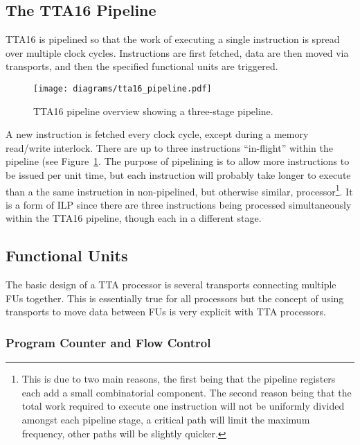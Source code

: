 \subsection{The TTA16 Pipeline}
TTA16 is pipelined so that the work of executing a single instruction is spread
over multiple clock cycles. Instructions are first fetched, data are then moved
via transports, and then the specified functional units are triggered.

\begin{figure}[h!]
\begin{center}
\texttt{[image: diagrams/tta16\_pipeline.pdf]}
\caption[TTA16 pipeline overview]{TTA16 pipeline overview showing a three-stage
pipeline.}
\end{center}
\label{TTA16_Pipeline}
\end{figure}

A new instruction is fetched every clock cycle, except during a memory read/write
interlock. There are up to three instructions ``in-flight'' within the pipeline
(see Figure~\ref{TTA16_Pipeline}. The purpose of pipelining is to allow more
instructions to be issued per unit time, but each instruction will probably take
longer to execute than a the same instruction in non-pipelined, but otherwise
similar, processor\footnote{This is due to two main reasons, the first being that
the pipeline registers each add a small combinatorial component. The second
reason being that the total work required to execute one instruction will not be
uniformly divided amongst each pipeline stage, a critical path will limit the
maximum frequency, other paths will be slightly quicker.}. It is a form of ILP
since there are three instructions being processed simultaneously within the
TTA16 pipeline, though each in a different stage.


\subsection{Functional Units}
\label{TTA16_FUs}
The basic design of a TTA processor is several transports connecting multiple
FUs together. This is essentially true for all processors but the concept of
using transports to move data between FUs is very explicit with TTA processors.


\subsubsection{Program Counter and Flow Control}


